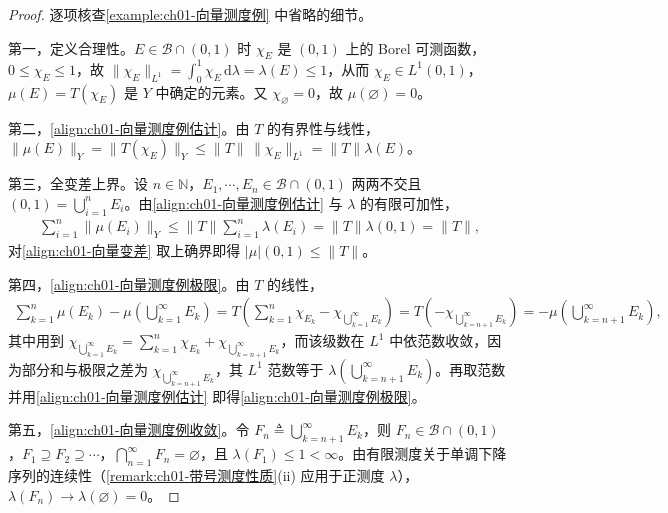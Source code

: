 \documentclass[../../main.tex]{subfiles}%
\begin{document}
\begin{proof}
逐项核查\cref{example:ch01-向量测度例} 中省略的细节。

第一，定义合理性。$E\in\mathcal{B}\cap(0,1)$ 时 $\chi_E$ 是 $(0,1)$ 上的 Borel 可测函数，$0\leqslant\chi_E\leqslant1$，故 $\|\chi_E\|_{L^1}=\int_0^1\chi_E\,\mathrm{d}\lambda=\lambda(E)\leqslant1$，从而 $\chi_E\in L^1(0,1)$，$\mu(E)=T(\chi_E)$ 是 $Y$ 中确定的元素。又 $\chi_{\varnothing}=0$，故 $\mu(\varnothing)=0$。

第二，\eqref{align:ch01-向量测度例估计}。由 $T$ 的有界性与线性，$\|\mu(E)\|_Y=\|T(\chi_E)\|_Y\leqslant\|T\|\,\|\chi_E\|_{L^1}=\|T\|\lambda(E)$。

第三，全变差上界。设 $n\in\mathbb{N}$，$E_1,\cdots ,E_n\in\mathcal{B}\cap(0,1)$ 两两不交且 $(0,1)=\bigcup_{i=1}^n E_i$。由\eqref{align:ch01-向量测度例估计} 与 $\lambda$ 的有限可加性，
\begin{align*}
\sum_{i=1}^n\|\mu(E_i)\|_Y\leqslant\|T\|\sum_{i=1}^n\lambda(E_i)=\|T\|\lambda(0,1)=\|T\|,
\end{align*}
对\eqref{align:ch01-向量变差} 取上确界即得 $|\mu|(0,1)\leqslant\|T\|$。

第四，\eqref{align:ch01-向量测度例极限}。由 $T$ 的线性，
\begin{align*}
\sum_{k=1}^n\mu(E_k)-\mu\left(\bigcup_{k=1}^\infty E_k\right)
=T\left(\sum_{k=1}^n\chi_{E_k}-\chi_{\bigcup_{k=1}^\infty E_k}\right)
=T\left(-\chi_{\bigcup_{k=n+1}^\infty E_k}\right)=-\mu\left(\bigcup_{k=n+1}^\infty E_k\right),
\end{align*}
其中用到 $\chi_{\bigcup_{k=1}^\infty E_k}=\sum_{k=1}^n\chi_{E_k}+\chi_{\bigcup_{k=n+1}^\infty E_k}$，而该级数在 $L^1$ 中依范数收敛，因为部分和与极限之差为 $\chi_{\bigcup_{k=n+1}^\infty E_k}$，其 $L^1$ 范数等于 $\lambda\left(\bigcup_{k=n+1}^\infty E_k\right)$。再取范数并用\eqref{align:ch01-向量测度例估计} 即得\eqref{align:ch01-向量测度例极限}。

第五，\eqref{align:ch01-向量测度例收敛}。令 $F_n\triangleq\bigcup_{k=n+1}^\infty E_k$，则 $F_n\in\mathcal{B}\cap(0,1)$，$F_1\supseteq F_2\supseteq\cdots$，$\bigcap_{n=1}^\infty F_n=\varnothing$，且 $\lambda(F_1)\leqslant1<\infty$。由有限测度关于单调下降序列的连续性（\cref{remark:ch01-带号测度性质}(ii) 应用于正测度 $\lambda$），$\lambda(F_n)\to\lambda(\varnothing)=0$。
\end{proof}
\end{document}
